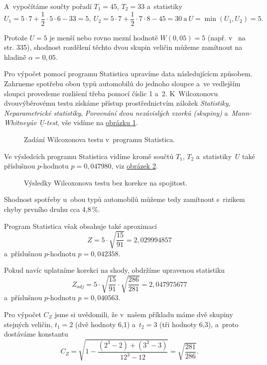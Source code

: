 A~vypočítáme součty pořadí $T_1=45$, $T_2=33$ a~statistiky
$$U_1=5\cdot 7 + \frac12 \cdot 5\cdot 6 -33=5 , \
U_2=5\cdot 7 + \frac12 \cdot 7\cdot 8 -45=30 \ \mbox{a} \ U=\min(U_1,U_2)=5 .$$

Protože $U=5$ je menší nebo rovno mezní hodnotě $W(0{,}05)=5$ (např. v~\cite{1} na str. 335), shodnost rozdělení těchto dvou skupin veličin můžeme zamítnout na hladině $\alpha = 0{,}05$.

Pro výpočet pomocí programu Statistica upravíme data následujícícm způsobem. Zahrneme spotřebu obou typů automobilů do jednoho sloupce a~ve vedlejším sloupci provedeme rozlišení třeba pomocí číslic 1 a~2. K~Wilcoxonovu dvouvýběrovému testu získáme přístup prostřednictvím záložek {\it Statistiky}, {\it Neparametrické statistiky}, {\it Porovnání dvou nezávislých vzorků (skupiny)} a~{\it Mann-Whitneyův \b{U}-test}, vše vidíme na  \hyperref[obrazek1]{obrázku 1}.

\begin{figure}[!ht]
\caption{Zadání Wilcoxonova testu v~programu Statistica.}
\label{obrazek1}
\end{figure}

Ve výsledcích programu Statistica vidíme kromě součtů $T_1$, $T_2$ a~statistiky~$U$ také příslušnou $p$-hodnotu $p=0{,}047980$, viz \hyperref[obrazek2]{obrázek 2}.

\begin{figure}[!hbt]
\caption{Výsledky Wilcoxonova testu bez korekce na spojitost.}
\label{obrazek2}
\end{figure}

Shodnost spotřeby u~obou typů automobilů můžeme tedy zamítnout s~rizikem chyby prvního druhu cca 4,8\,\%.

Program Statistica však obsahuje také aproximaci
$$ Z=5\cdot \sqrt{ \frac{15}{91}} =2{,}029994857 $$
a~příslušnou $p$-hodnotu $p=0{,}042358$.

Pokud navíc uplatníme korekci na shody, obdržíme upravenou statistiku
$$ Z_{adj}=5\cdot \sqrt{ \frac{15}{91}}\cdot \sqrt{\frac{286}{281}} =2{,}047975677 $$
a~příslušnou $p$-hodnotu $p=0{,}040563$.

Pro výpočet $C_Z$ jsme si uvědomili, že v~našem příkladu máme dvě skupiny stejných veličin,  $t_1=2$ (dvě hodnoty 6,1)  a~$t_2=3$ (tři hodnoty 6,3), a~proto dostáváme konstantu
$$C_Z=\sqrt{1-\frac{(2^3-2) + (3^3-3)}{12^3-12}}=\sqrt{\frac{281}{286}} .$$

